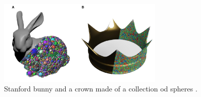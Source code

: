 \documentclass[11pt,a4paper]{article}
\begin{document}
	 \begin{figure}[H]
	\begin{center}
	\includegraphics[width=0.7\textwidth]{5.PNG}
	
	\caption{ Stanford bunny and a crown made of a collection od spheres	.}
	\label{fig:2}
	\end{center}
	\end{figure}
\end{document}
